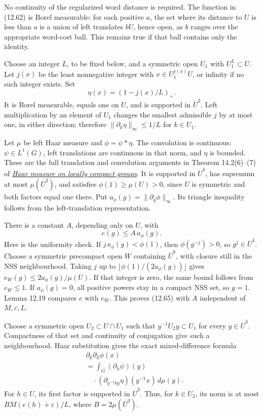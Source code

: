 \documentclass[
  11pt,
]{article}
\begin{document}
No continuity of the regularized word distance is required. The function
in (12.62) is Borel measurable: for each positive \(a\), the set where
its distance to \(U\) is less than \(a\) is a union of left translates
\(bU\), hence open, as \(b\) ranges over the appropriate word-cost ball.
This remains true if that ball contains only the identity.

Choose an integer \(L\), to be fixed below, and a symmetric open \(U_1\)
with \(U_1^L\subset U\). Let \(j(x)\) be the least nonnegative integer
with \(x\in U_1^{j(x)}U\), or infinity if no such integer exists. Set \[
\eta(x)=(1-j(x)/L)_+.
\tag{12.64}
\] It is Borel measurable, equals one on \(U\), and is supported in
\(\overline U^2\). Left multiplication by an element of \(U_1\) changes
the smallest admissible \(j\) by at most one, in either direction;
therefore \(\|\partial_k\eta\|_\infty\leq1/L\) for \(k\in U_1\).

Let \(\mu\) be left Haar measure and \(\phi=\psi*\eta\). The convolution
is continuous: \(\psi\in L^1(G)\), left translations are continuous in
that norm, and \(\eta\) is bounded. These are the full translation and
convolution arguments in Theorem 14.2(6)--(7) of
\href{https://kokunoyumeto.github.io/open-math-courses/courses/harmonic-analysis-on-locally-compact-groups/reader/haar-measure-on-locally-compact-groups.html}{\emph{Haar
measure on locally compact groups}}. It is supported in
\(\overline U^4\), has supremum at most \(\mu(\overline U^2)\), and
satisfies \(\phi(1)\geq\mu(U)>0\), since \(U\) is symmetric and both
factors equal one there. Put \(a_\phi(g)=\|\partial_g\phi\|_\infty\).
Its triangle inequality follows from the left-translation
representation.

There is a constant \(A\), depending only on \(U\), with \[
e(g)\leq A\,a_\phi(g).
\tag{12.65}
\] Here is the uniformity check. If \(j\,a_\phi(g)<\phi(1)\), then
\(\phi(g^{-j})>0\), so \(g^j\in\overline U^4\). Choose a symmetric
precompact open \(W\) containing \(\overline U^8\), with closure still
in the NSS neighbourhood. Taking \(j\) up to
\(\lfloor\phi(1)/(2a_\phi(g))\rfloor\) gives
\(e_W(g)\leq2a_\phi(g)/\mu(U)\). If that integer is zero, the same bound
follows from \(e_W\leq1\). If \(a_\phi(g)=0\), all positive powers stay
in a compact NSS set, so \(g=1\). Lemma 12.19 compares \(e\) with
\(e_W\). This proves (12.65) with \(A\) independent of
\(M,\varepsilon,L\).

Choose a symmetric open \(U_2\subset U\cap U_1\) such that
\(y^{-1}U_2y\subset U_1\) for every \(y\in\overline U^3\). Compactness
of that set and continuity of conjugation give such a neighbourhood.
Haar substitution gives the exact mixed-difference formula \[
\begin{aligned}
&\partial_k\partial_h\phi(x)\\
&=\int_G(\partial_h\psi)(y)\\
&\quad\cdot(\partial_{y^{-1}ky}\eta)(y^{-1}x)\,d\mu(y).
\end{aligned}
\tag{12.66}
\] For \(h\in U\), its first factor is supported in \(\overline U^3\).
Thus, for \(k\in U_2\), its norm is at most \(B M(e(h)+\varepsilon)/L\),
where \(B=2\mu(\overline U^3)\).
\end{document}
